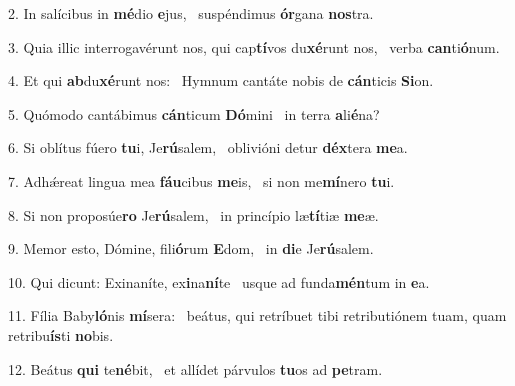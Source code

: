 2. In salícibus in \textbf{mé}dio \textbf{e}jus, \ast\  suspéndimus \textbf{ór}gana \textbf{nos}tra.\

3. Quia illic interrogavérunt nos, qui cap\textbf{tí}vos du\textbf{xé}runt nos, \ast\  verba \textbf{can}ti\textbf{ó}num.\

4. Et qui \textbf{ab}du\textbf{xé}runt nos: \ast\  Hymnum cantáte nobis de \textbf{cán}ticis \textbf{Si}on.\

5. Quómodo cantábimus \textbf{cán}ticum \textbf{Dó}mini \ast\  in terra \textbf{a}li\textbf{é}na?\

6. Si oblítus fúero \textbf{tu}i, Je\textbf{rú}salem, \ast\  oblivióni detur \textbf{déx}tera \textbf{me}a.\

7. Adhǽreat lingua mea \textbf{fáu}cibus \textbf{me}is, \ast\  si non me\textbf{mí}nero \textbf{tu}i.\

8. Si non proposúe\textbf{ro} Je\textbf{rú}salem, \ast\  in princípio læ\textbf{tí}tiæ \textbf{me}æ.\

9. Memor esto, Dómine, fili\textbf{ó}rum \textbf{E}dom, \ast\  in \textbf{di}e Je\textbf{rú}salem.\

10. Qui dicunt: Exinaníte, ex\textbf{i}na\textbf{ní}te \ast\  usque ad funda\textbf{mén}tum in \textbf{e}a.\

11. Fília Baby\textbf{ló}nis \textbf{mí}sera: \ast\  beátus, qui retríbuet tibi retributiónem tuam, quam retribu\textbf{ís}ti \textbf{no}bis.\

12. Beátus \textbf{qui} te\textbf{né}bit, \ast\  et allídet párvulos \textbf{tu}os ad \textbf{pe}tram.\

